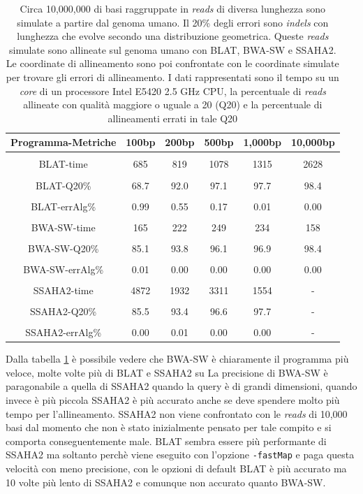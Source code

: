 \documentclass[conference]{IEEEtran}
\begin{document}
\begin{table}
\begin{center}
\begin{tabular}{|c|c|c|c|c|c|}
Programma-Metriche & 100bp & 200bp & 500bp & 1,000bp & 10,000bp \\
\hline{}
&&&&&\\
BLAT-time & 685 & 819 & 1078 & 1315 & 2628 \\
&&&&&\\
BLAT-Q20\% & 68.7 & 92.0 & 97.1 & 97.7 & 98.4 \\
&&&&&\\
BLAT-errAlg\% & 0.99 & 0.55 & 0.17 & 0.01 & 0.00 \\
&&&&&\\
BWA-SW-time & 165 & 222 & 249 & 234 & 158 \\
&&&&&\\
BWA-SW-Q20\% & 85.1 & 93.8 & 96.1 & 96.9 & 98.4\\
&&&&&\\
BWA-SW-errAlg\% & 0.01 & 0.00 & 0.00 & 0.00 & 0.00\\
&&&&&\\
SSAHA2-time & 4872 & 1932 & 3311 & 1554 & - \\
&&&&&\\
SSAHA2-Q20\% & 85.5 & 93.4 & 96.6 & 97.7 & - \\
&&&&&\\
SSAHA2-errAlg\% & 0.00 & 0.01 & 0.00 & 0.00 & - \\
\end{tabular}
\end{center}
\caption{Circa 10,000,000 di basi raggruppate in \textit{reads} di diversa lunghezza sono simulate a partire dal genoma umano. Il 20\% degli errori sono \textit{indels} con lunghezza che evolve secondo una distribuzione geometrica. Queste \textit{reads} simulate sono allineate sul genoma umano con BLAT, BWA-SW e SSAHA2. Le coordinate di allineamento sono poi confrontate con le coordinate simulate per trovare gli errori di allineamento. I dati rappresentati sono il tempo su un \textit{core} di un processore Intel E5420 2.5 GHz CPU, la percentuale di \textit{reads} allineate con qualità maggiore o uguale a 20 (Q20) e la percentuale di allineamenti errati in tale Q20}
\label{tab:BWA-SW}
\end{table}

Dalla tabella \ref{tab:BWA-SW} è possibile vedere che BWA-SW è chiaramente il programma più veloce, molte volte più di BLAT e SSAHA2 su 
La precisione di BWA-SW è paragonabile a quella di SSAHA2 quando la query è di grandi dimensioni, quando invece è più piccola SSAHA2 è più accurato anche se deve spendere molto più tempo per l'allineamento. SSAHA2 non viene confrontato con le \textit{reads} di 10,000 basi dal momento che non è stato inizialmente pensato per tale compito e si comporta conseguentemente male. BLAT sembra essere più performante di SSAHA2 ma soltanto perchè viene eseguito con l'opzione \texttt{-fastMap} e paga questa velocità con meno precisione, con le opzioni di default BLAT è più accurato ma 10 volte più lento di SSAHA2 e comunque non accurato quanto BWA-SW.\\
\end{document}

